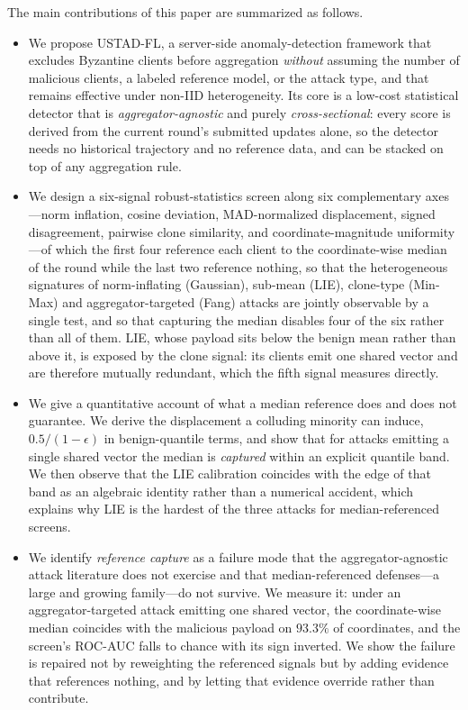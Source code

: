 \documentclass[journal]{IEEEtran}
\begin{document}
The main contributions of this paper are summarized as follows.
\begin{itemize}
    \item We propose USTAD-FL, a server-side anomaly-detection framework that excludes Byzantine clients before aggregation \emph{without} assuming the number of malicious clients, a labeled reference model, or the attack type, and that remains effective under non-IID heterogeneity. Its core is a low-cost statistical detector that is \emph{aggregator-agnostic} and purely \emph{cross-sectional}: every score is derived from the current round's submitted updates alone, so the detector needs no historical trajectory and no reference data, and can be stacked on top of any aggregation rule.
    \item We design a six-signal robust-statistics screen along six complementary axes---norm inflation, cosine deviation, MAD-normalized displacement, signed disagreement, pairwise clone similarity, and coordinate-magnitude uniformity---of which the first four reference each client to the coordinate-wise median of the round while the last two reference nothing, so that the heterogeneous signatures of norm-inflating (Gaussian), sub-mean (LIE), clone-type (Min-Max) and aggregator-targeted (Fang) attacks are jointly observable by a single test, and so that capturing the median disables four of the six rather than all of them. LIE, whose payload sits below the benign mean rather than above it, is exposed by the clone signal: its clients emit one shared vector and are therefore mutually redundant, which the fifth signal measures directly.
    \item We give a quantitative account of what a median reference does and does not guarantee. We derive the displacement a colluding minority can induce, $0.5/(1-\epsilon)$ in benign-quantile terms, and show that for attacks emitting a single shared vector the median is \emph{captured} within an explicit quantile band. We then observe that the LIE calibration coincides with the edge of that band as an algebraic identity rather than a numerical accident, which explains why LIE is the hardest of the three attacks for median-referenced screens.
    \item We identify \emph{reference capture} as a failure mode that the aggregator-agnostic attack literature does not exercise and that median-referenced defenses---a large and growing family---do not survive. We measure it: under an aggregator-targeted attack emitting one shared vector, the coordinate-wise median coincides with the malicious payload on $93.3\%$ of coordinates, and the screen's ROC-AUC falls to chance with its sign inverted. We show the failure is repaired not by reweighting the referenced signals but by adding evidence that references nothing, and by letting that evidence override rather than contribute.

\end{itemize}
\end{document}
